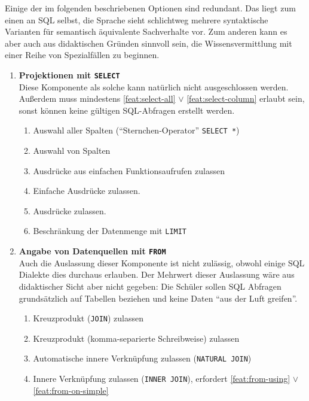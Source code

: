 Einige der im folgenden beschriebenen Optionen sind redundant. Das liegt zum einen an SQL selbst, die Sprache sieht schlichtweg mehrere syntaktische Varianten für semantisch äquivalente Sachverhalte vor. Zum anderen kann es aber auch aus didaktischen Gründen sinnvoll sein, die Wissensvermittlung mit einer Reihe von Spezialfällen zu beginnen.

\begin{enumerate}
\item \textbf{Projektionen mit \texttt{SELECT}} \\
  Diese Komponente als solche kann natürlich nicht ausgeschlossen werden. Außerdem muss mindestens \ref{feat:select-all} $\lor$ \ref{feat:select-column} erlaubt sein, sonst können keine gültigen SQL-Abfragen erstellt werden.
  \begin{enumerate}
  \item \label{feat:select-all} Auswahl aller Spalten (``Sternchen-Operator'' \texttt{SELECT *})
  \item \label{feat:select-column} Auswahl von Spalten
  \item \label{feat:select-single-function} Ausdrücke aus einfachen Funktionsaufrufen zulassen
  \item \label{feat:select-simple-expression} Einfache Ausdrücke zulassen.
  \item \label{feat:select-expression} Ausdrücke zulassen.
  \item \label{feat:select-limit} Beschränkung der Datenmenge mit \texttt{LIMIT}
  \end{enumerate}
\item \textbf{Angabe von Datenquellen mit \texttt{FROM}} \\
  Auch die Auslassung dieser Komponente ist nicht zulässig, obwohl einige SQL Dialekte dies durchaus erlauben. Der Mehrwert dieser Auslassung wäre aus didaktischer Sicht aber nicht gegeben: Die Schüler sollen SQL Abfragen grundsätzlich auf Tabellen beziehen und keine Daten ``aus der Luft greifen''.
  \begin{enumerate}
  \item \label{feat:from-cross-join} Kreuzprodukt (\texttt{JOIN}) zulassen
  \item \label{feat:from-cross-comma} Kreuzprodukt (komma-separierte Schreibweise) zulassen
  \item \label{feat:from-natural-join} Automatische innere Verknüpfung zulassen (\texttt{NATURAL JOIN})
  \item \label{feat:from-inner-join} Innere Verknüpfung zulassen (\texttt{INNER JOIN}), erfordert \ref{feat:from-using} $\lor$ \ref{feat:from-on-simple}

\end{enumerate}
\end{enumerate}
